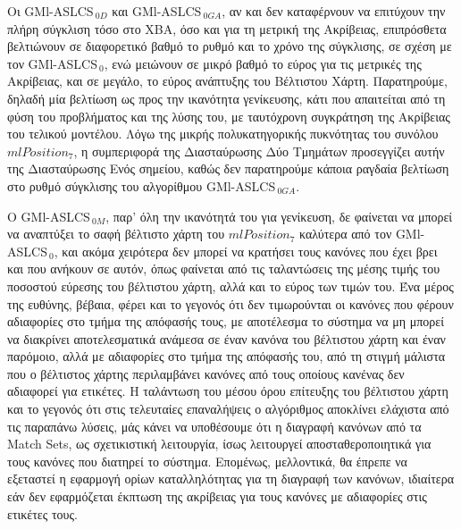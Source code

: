 Οι GMl-ASLCS$_{\:0D}$ και GMl-ASLCS$_{\:0GA}$, αν και δεν καταφέρνουν να επιτύχουν την πλήρη σύγκλιση τόσο στο ΧΒΑ, όσο και για τη μετρική της Ακρίβειας, επιπρόσθετα βελτιώνουν σε διαφορετικό βαθμό το ρυθμό και το χρόνο της σύγκλισης, σε σχέση με τον GMl-ASLCS$_{\:0}$, ενώ μειώνουν σε μικρό βαθμό το εύρος για τις μετρικές της Ακρίβειας, και σε μεγάλο, το εύρος ανάπτυξης του Βέλτιστου Χάρτη. Παρατηρούμε, δηλαδή μία βελτίωση ως προς την ικανότητα γενίκευσης, κάτι που απαιτείται από τη φύση του προβλήματος και της λύσης του, με ταυτόχρονη συγκράτηση της Ακρίβειας του τελικού μοντέλου. Λόγω της μικρής πολυκατηγορικής πυκνότητας του συνόλου $mlPosition_{7}$, η συμπεριφορά της Διασταύρωσης Δύο Τμημάτων προσεγγίζει αυτήν της Διασταύρωσης Ενός σημείου, καθώς δεν παρατηρούμε κάποια ραγδαία βελτίωση στο ρυθμό σύγκλισης του αλγορίθμου GMl-ASLCS$_{\:0GA}$.

Ο GMl-ASLCS$_{\:0M}$, παρ' όλη την ικανότητά του για γενίκευση, δε φαίνεται να μπορεί να αναπτύξει το σαφή βέλτιστο χάρτη του $mlPosition_{7}$ καλύτερα από τον GMl-ASLCS$_{\:0}$, και ακόμα χειρότερα δεν μπορεί να κρατήσει τους κανόνες που έχει βρει και που ανήκουν σε αυτόν, όπως φαίνεται από τις ταλαντώσεις της μέσης τιμής του ποσοστού εύρεσης του βέλτιστου χάρτη, αλλά και το εύρος των τιμών του. Ένα μέρος της ευθύνης, βέβαια, φέρει και το γεγονός ότι δεν τιμωρούνται οι κανόνες που φέρουν αδιαφορίες στο τμήμα της απόφασής τους, με αποτέλεσμα το σύστημα να μη μπορεί να διακρίνει αποτελεσματικά ανάμεσα σε έναν κανόνα του βέλτιστου χάρτη και έναν παρόμοιο, αλλά με αδιαφορίες στο τμήμα της απόφασής του, από τη στιγμή μάλιστα που ο βέλτιστος χάρτης περιλαμβάνει κανόνες από τους οποίους κανένας δεν αδιαφορεί για ετικέτες. Η ταλάντωση του μέσου όρου επίτευξης του βέλτιστου χάρτη και το γεγονός ότι στις τελευταίες επαναλήψεις ο αλγόριθμος αποκλίνει ελάχιστα από τις παραπάνω λύσεις, μάς κάνει να υποθέσουμε ότι η διαγραφή κανόνων από τα Match Sets, ως σχετικιστική λειτουργία, ίσως λειτουργεί αποσταθεροποιητικά για τους κανόνες που διατηρεί το σύστημα. Επομένως, μελλοντικά, θα έπρεπε να εξεταστεί η εφαρμογή ορίων καταλληλότητας για τη διαγραφή των κανόνων, ιδιαίτερα εάν δεν εφαρμόζεται έκπτωση της ακρίβειας για τους κανόνες με αδιαφορίες στις ετικέτες τους.

